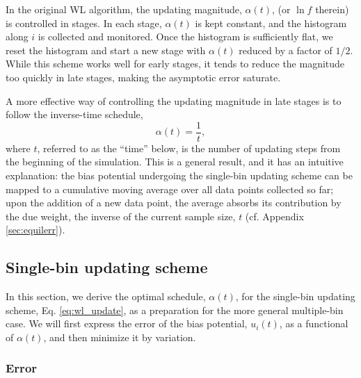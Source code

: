 \documentclass[preprint, superscriptaddress, floatfix]{revtex4-1}
\begin{document}
In the original WL algorithm\cite{
wang2001, wang2001pre},
the updating magnitude, $\alpha(t)$,
(or $\ln f$ therein)
is controlled in stages.
%
In each stage, $\alpha(t)$
is kept constant,
and the histogram along $i$
is collected and monitored.
%
Once the histogram is sufficiently flat,
we reset the histogram and start a new stage
with $\alpha(t)$ reduced by a factor of $1/2$.\cite{
  wang2001, wang2001pre}
%
While this scheme works well for early stages,
it tends to reduce the magnitude
too quickly in late stages, making the asymptotic error
saturate\cite{
belardinelli2007, *belardinelli2007jcp, *belardinelli2008, *belardinelli2016}.


A more effective way
of controlling the updating magnitude in late stages
is to follow the inverse-time schedule,\cite{
  belardinelli2007, *belardinelli2007jcp, *belardinelli2008, *belardinelli2016,
  morozov2009, zhou2008,
  komura2012, *caparica2012, *caparica2014}
%
\begin{equation}
  \alpha(t) = \frac{1}{t},
  \label{eq:alpha_invt}
\end{equation}
%
where $t$, referred to as the ``time'' below,
is the number of updating steps
from the beginning of the simulation.
%
This is a general result,\cite{robbins1951, pellegrini2014}
and it has an intuitive explanation:\cite{
  marsili2006, barducci2008}
the bias potential undergoing the single-bin updating scheme
can be mapped to a cumulative moving average over all data points collected so far;
upon the addition of a new data point,
the average absorbs its contribution by the due weight,
the inverse of the current sample size, $t$
(cf. Appendix \ref{sec:equilerr}).




\subsection{\label{sec:single-bin}
Single-bin updating scheme}



In this section,
we derive the optimal schedule, $\alpha(t)$,
for the single-bin updating scheme,
Eq. \eqref{eq:wl_update},
as a preparation
for the more general multiple-bin case.
%
We will first express the error of
the bias potential, $u_i(t)$,
as a functional of $\alpha(t)$,
and then minimize it by variation.
%



\subsubsection{Error}
\end{document}
